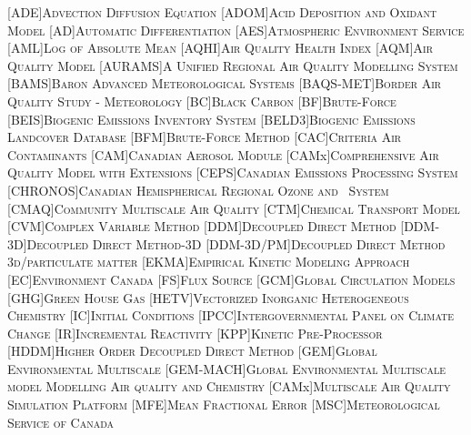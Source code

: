 \singlespace
\begin{acronym}
	[ADE]{\textsc{Advection Diffusion Equation}}
	[ADOM]{\textsc{Acid Deposition and Oxidant Model}}
	[AD]{\textsc{Automatic Differentiation}}
	[AES]{\textsc{Atmospheric Environment Service}}
	[AML]{\textsc{Log of Absolute Mean}}
	[AQHI]{\textsc{Air Quality Health Index}}
	[AQM]{\textsc{Air Quality Model}}
	[AURAMS]{\textsc{A Unified Regional Air Quality Modelling System}}
	[BAMS]{\textsc{Baron Advanced Meteorological Systems}}
	[BAQS-MET]{\textsc{Border Air Quality Study - Meteorology}}
	[BC]{\textsc{Black Carbon}}
	[BF]{\textsc{Brute-Force}}
	[BEIS]{\textsc{Biogenic Emissions Inventory System}}
	[BELD3]{\textsc{Biogenic Emissions Landcover Database}}
	[BFM]{\textsc{Brute-Force Method}}
	[CAC]{\textsc{Criteria Air Contaminants}}
	[CAM]{\textsc{Canadian Aerosol Module}}
	[CAMx]{\textsc{Comprehensive Air Quality Model with Extensions}}
	[CEPS]{\textsc{Canadian Emissions Processing System}}
	[CHRONOS]{\textsc{Canadian Hemispherical Regional Ozone and \nox~System}}
	[CMAQ]{\textsc{Community Multiscale Air Quality}}
	[CTM]{\textsc{Chemical Transport Model}}
	[CVM]{\textsc{Complex Variable Method}}
	[DDM]{\textsc{Decoupled Direct Method}}
	[DDM-3D]{\textsc{Decoupled Direct Method-3D}}
	[DDM-3D/PM]{\textsc{Decoupled Direct Method 3d/particulate matter}}
	[EKMA]{\textsc{Empirical Kinetic Modeling Approach}}
	[EC]{\textsc{Environment Canada}}
	[FS]{\textsc{Flux Source}}
	[GCM]{\textsc{Global Circulation Models}}
	[GHG]{\textsc{Green House Gas}}
	[HETV]{\textsc{Vectorized Inorganic Heterogeneous Chemistry}}
	[IC]{\textsc{Initial Conditions}}
	[IPCC]{\textsc{Intergovernmental Panel on Climate Change}}
	[IR]{\textsc{Incremental Reactivity}}
	[KPP]{\textsc{Kinetic Pre-Processor}}
	[HDDM]{\textsc{Higher Order Decoupled Direct Method}}
	[GEM]{\textsc{Global Environmental Multiscale}}
	[GEM-MACH]{\textsc{Global Environmental Multiscale model Modelling Air quality and Chemistry}}
	[CAMx]{\textsc{Multiscale Air Quality Simulation Platform}}
	[MFE]{\textsc{Mean Fractional Error}}
	[MSC]{\textsc{Meteorological Service of Canada}}

\end{acronym}

